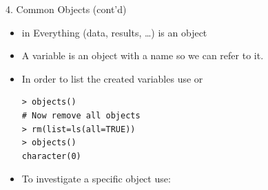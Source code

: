 \documentclass[14pt, aspectratio=169, sectionpage=simple, xclolor=table]{beamer}
\begin{document}
\begin{frame}[fragile]{4. Common \R Objects (cont'd)}
\begin{itemize}
\item in \R Everything (data, results, \ldots) is an object 
\item A variable is an object with a name so we can refer to it.
\item In order to list the created variables use  or 
{\small
\begin{verbatim}
> objects()
# Now remove all objects
> rm(list=ls(all=TRUE))
> objects()
character(0)
\end{verbatim}
}
\item To investigate a specific object  use: 
\end{itemize}
\end{frame}
\end{document}
